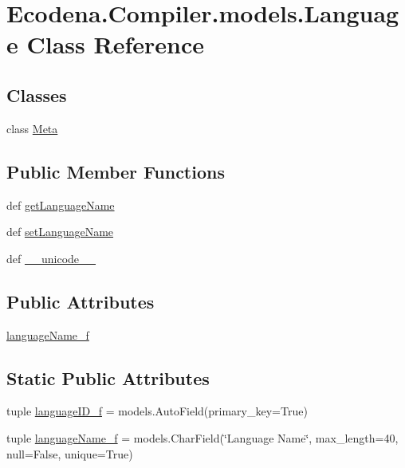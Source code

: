 \hypertarget{class_ecodena_1_1_compiler_1_1models_1_1_language}{
\section{Ecodena.Compiler.models.Language Class Reference}
\label{de/dfd/class_ecodena_1_1_compiler_1_1models_1_1_language}
}
\subsection*{Classes}
\begin{DoxyCompactItemize}
\item 
class \hyperlink{class_ecodena_1_1_compiler_1_1models_1_1_language_1_1_meta}{Meta}
\end{DoxyCompactItemize}
\subsection*{Public Member Functions}
\begin{DoxyCompactItemize}
\item 
def \hyperlink{class_ecodena_1_1_compiler_1_1models_1_1_language_ad1ac47891b8d33cfcc13e562e23195cf}{getLanguageName}
\item 
def \hyperlink{class_ecodena_1_1_compiler_1_1models_1_1_language_a5479e3ba52dec0196bf6b07a99395857}{setLanguageName}
\item 
def \hyperlink{class_ecodena_1_1_compiler_1_1models_1_1_language_a2665f3ffe1371ac1c1cd6bb779c70fd6}{\_\-\_\-unicode\_\-\_\-}
\end{DoxyCompactItemize}
\subsection*{Public Attributes}
\begin{DoxyCompactItemize}
\item 
\hyperlink{class_ecodena_1_1_compiler_1_1models_1_1_language_a0bc8a64cd3ab03e78c7664f39c350cd3}{languageName\_\-f}
\end{DoxyCompactItemize}
\subsection*{Static Public Attributes}
\begin{DoxyCompactItemize}
\item 
tuple \hyperlink{class_ecodena_1_1_compiler_1_1models_1_1_language_a5bf9c2c0b3d1bc31d6b519491820fdbb}{languageID\_\-f} = models.AutoField(primary\_\-key=True)
\item 
tuple \hyperlink{class_ecodena_1_1_compiler_1_1models_1_1_language_a8aafd0b732996210ac1fc87d9fdc77f7}{languageName\_\-f} = models.CharField(\char`\"{}Language Name\char`\"{}, max\_\-length=40, null=False, unique=True)
\end{DoxyCompactItemize}
